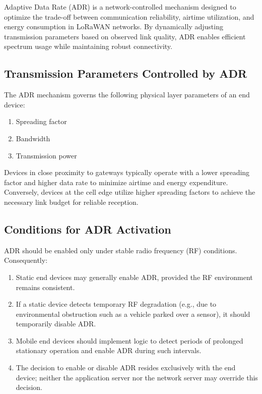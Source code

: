 Adaptive Data Rate (ADR) is a network-controlled mechanism designed to optimize the trade-off between communication reliability, airtime utilization, and energy consumption in LoRaWAN networks. By dynamically adjusting transmission parameters based on observed link quality, ADR enables efficient spectrum usage while maintaining robust connectivity.

\subsection{Transmission Parameters Controlled by ADR}

The ADR mechanism governs the following physical layer parameters of an end device:

\begin{enumerate}
    \item Spreading factor
    \item Bandwidth
    \item Transmission power
\end{enumerate}

Devices in close proximity to gateways typically operate with a lower spreading factor and higher data rate to minimize airtime and energy expenditure. Conversely, devices at the cell edge utilize higher spreading factors to achieve the necessary link budget for reliable reception.

\subsection{Conditions for ADR Activation}

ADR should be enabled only under stable radio frequency (RF) conditions. Consequently:

\begin{enumerate}
    \item Static end devices may generally enable ADR, provided the RF environment remains consistent.
    \item If a static device detects temporary RF degradation (e.g., due to environmental obstruction such as a vehicle parked over a sensor), it should temporarily disable ADR.
    \item Mobile end devices should implement logic to detect periods of prolonged stationary operation and enable ADR during such intervals.
    \item The decision to enable or disable ADR resides exclusively with the end device; neither the application server nor the network server may override this decision.
\end{enumerate}

